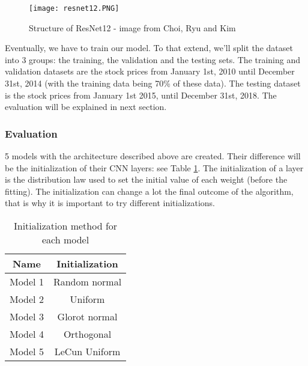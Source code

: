 \documentclass[11pt]{article}
\begin{document}
\begin{onehalfspace}
\begin{figure}[h!]
     \centering
     \captionsetup{justification=centering}
     \texttt{[image: resnet12.PNG]}
     \caption{Structure of ResNet12 - image from Choi, Ryu and Kim \cite{choi}}
\label{fig:resnet12}
\end{figure}

Eventually, we have to train our model. To that extend, we'll split the dataset into 3 groups: the training, the validation and the testing sets. The training and validation datasets are the stock prices from January 1st, 2010 until December 31st, 2014 (with the training data being 70\% of these data). The testing dataset is the stock prices from January 1st 2015, until December 31st, 2018. The evaluation will be explained in next section.


\subsubsection{Evaluation}
\label{sec:meth_eval}

5 models with the architecture described above are created. Their difference will be the initialization of their CNN layers: see Table \ref{table:initialization}. The initialization of a layer is the distribution law used to set the initial value of each weight (before the fitting). The initialization can change a lot the final outcome of the algorithm, that is why it is important to try different initializations.

\begin{table}[h!]
    \begin{center}
        \begin{tabular}{ | c | c |}
            \hline
            \textbf{Name} & \textbf{Initialization} \\ 
            \hline \hline
            Model 1 & Random normal \\  \hline
            Model 2 & Uniform \\  \hline
            Model 3 & Glorot normal \\  \hline
            Model 4 & Orthogonal \\  \hline
            Model 5 & LeCun Uniform \\  
            \hline
        \end{tabular}
    \end{center}
    \caption{Initialization method for each model}
    \label{table:initialization}
\end{table}


\end{onehalfspace}
\end{document}
